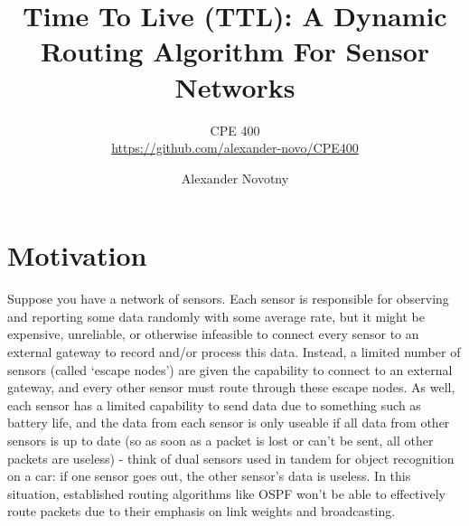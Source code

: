 \documentclass[headings=optiontoheadandtoc,listof=totoc,parskip=full]{scrartcl}
\title{Time To Live (TTL): A Dynamic Routing Algorithm For Sensor Networks}
\subtitle{CPE 400\\\url{https://github.com/alexander-novo/CPE400}}
\author{Alexander Novotny}
\begin{document}
\maketitle
\tableofcontents
{}

\newpage
{}


\section{Motivation}
Suppose you have a network of sensors. Each sensor is responsible for observing and reporting some data randomly with some average rate, but it might be expensive, unreliable, or otherwise infeasible to connect every sensor to an external gateway to record and/or process this data. Instead, a limited number of sensors (called `escape nodes') are given the capability to connect to an external gateway, and every other sensor must route through these escape nodes. As well, each sensor has a limited capability to send data due to something such as battery life, and the data from each sensor is only useable if all data from other sensors is up to date (so as soon as a packet is lost or can't be sent, all other packets are useless) - think of dual sensors used in tandem for object recognition on a car: if one sensor goes out, the other sensor's data is useless. In this situation, established routing algorithms like OSPF won't be able to effectively route packets due to their emphasis on link weights and broadcasting.
\end{document}
